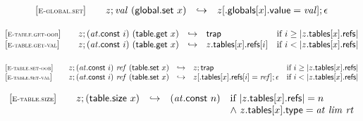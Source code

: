 $$
\begin{array}[t]{@{}lrcl@{}l@{}}
{[\textsc{\scriptsize E{-}global.set}]} \quad & z ; {\mathit{val}}~(\mathsf{global{.}set}~x) & \hookrightarrow & z{}[{.}\mathsf{globals}{}[x]{.}\mathsf{value} = {\mathit{val}}] ; \epsilon \\
\end{array}
$$

\vspace{1ex}

$$
\begin{array}[t]{@{}lrcl@{}l@{}}
{[\textsc{\scriptsize E{-}table.get{-}oob}]} \quad & z ; ({\mathit{at}}{.}\mathsf{const}~i)~(\mathsf{table{.}get}~x) & \hookrightarrow & \mathsf{trap} & \quad \mbox{if}~ i \geq {|z{.}\mathsf{tables}{}[x]{.}\mathsf{refs}|} \\
{[\textsc{\scriptsize E{-}table.get{-}val}]} \quad & z ; ({\mathit{at}}{.}\mathsf{const}~i)~(\mathsf{table{.}get}~x) & \hookrightarrow & z{.}\mathsf{tables}{}[x]{.}\mathsf{refs}{}[i] & \quad \mbox{if}~ i < {|z{.}\mathsf{tables}{}[x]{.}\mathsf{refs}|} \\
\end{array}
$$

$$
\begin{array}[t]{@{}lrcl@{}l@{}}
{[\textsc{\scriptsize E{-}table.set{-}oob}]} \quad & z ; ({\mathit{at}}{.}\mathsf{const}~i)~{\mathit{ref}}~(\mathsf{table{.}set}~x) & \hookrightarrow & z ; \mathsf{trap} & \quad \mbox{if}~ i \geq {|z{.}\mathsf{tables}{}[x]{.}\mathsf{refs}|} \\
{[\textsc{\scriptsize E{-}table.set{-}val}]} \quad & z ; ({\mathit{at}}{.}\mathsf{const}~i)~{\mathit{ref}}~(\mathsf{table{.}set}~x) & \hookrightarrow & z{}[{.}\mathsf{tables}{}[x]{.}\mathsf{refs}{}[i] = {\mathit{ref}}] ; \epsilon & \quad \mbox{if}~ i < {|z{.}\mathsf{tables}{}[x]{.}\mathsf{refs}|} \\
\end{array}
$$

\vspace{1ex}

$$
\begin{array}[t]{@{}lrcl@{}l@{}}
{[\textsc{\scriptsize E{-}table.size}]} \quad & z ; (\mathsf{table{.}size}~x) & \hookrightarrow & ({\mathit{at}}{.}\mathsf{const}~n) & \quad
\begin{array}[t]{@{}l@{}}
\mbox{if}~ {|z{.}\mathsf{tables}{}[x]{.}\mathsf{refs}|} = n \\
{\land}~ z{.}\mathsf{tables}{}[x]{.}\mathsf{type} = {\mathit{at}}~{\mathit{lim}}~{\mathit{rt}} \\
\end{array} \\
\end{array}
$$

